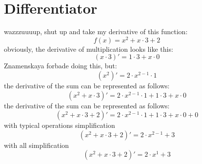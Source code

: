 \documentclass{article}
\begin{document}
\section{Differentiator}
wazzzuuuup, shut up and take my derivative of this function: \newline $$ f(x) = { {  {  {  x  }  ^  {  2  }  }  +  {  {  x  }  \cdot  {  3  }  }  }  +  {  2  } } $$obviously, the derivative of multiplication looks like this: $$ ({ {  x  }  \cdot  {  3  } })' = { {  {  1  }  \cdot  {  3  }  }  +  {  {  x  }  \cdot  {  0  }  } } $$
Znamenskaya forbade doing this, but: $$ ({ {  x  }  ^  {  2  } })' = { {  {  2  }  \cdot  {  {  x  }  ^  {  {  2  }  -  {  1  }  }  }  }  \cdot  {  1  } } $$
the derivative of the sum can be represented as follows: $$ ({ {  {  x  }  ^  {  2  }  }  +  {  {  x  }  \cdot  {  3  }  } })' = { {  {  {  2  }  \cdot  {  {  x  }  ^  {  {  2  }  -  {  1  }  }  }  }  \cdot  {  1  }  }  +  {  {  {  1  }  \cdot  {  3  }  }  +  {  {  x  }  \cdot  {  0  }  }  } } $$
the derivative of the sum can be represented as follows: $$ ({ {  {  {  x  }  ^  {  2  }  }  +  {  {  x  }  \cdot  {  3  }  }  }  +  {  2  } })' = { {  {  {  {  2  }  \cdot  {  {  x  }  ^  {  {  2  }  -  {  1  }  }  }  }  \cdot  {  1  }  }  +  {  {  {  1  }  \cdot  {  3  }  }  +  {  {  x  }  \cdot  {  0  }  }  }  }  +  {  0  } } $$
with typical operations simplification$$ ({ {  {  {  x  }  ^  {  2  }  }  +  {  {  x  }  \cdot  {  3  }  }  }  +  {  2  } })' = { {  {  2  }  \cdot  {  {  x  }  ^  {  {  2  }  -  {  1  }  }  }  }  +  {  3  } } $$
with all simplification$$ ({ {  {  {  x  }  ^  {  2  }  }  +  {  {  x  }  \cdot  {  3  }  }  }  +  {  2  } })' = { {  {  2  }  \cdot  {  {  x  }  ^  {  1  }  }  }  +  {  3  } } $$
\end{document}
